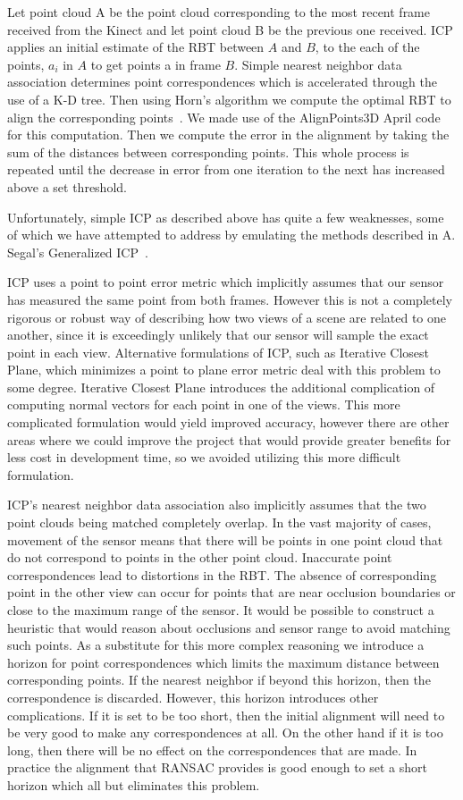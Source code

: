 \documentclass[letterpaper, 10pt, conference]{ieeeconf}
\begin{document}
	Let point cloud A be the point cloud corresponding to the most recent frame received from the Kinect and let point cloud B be the previous one received.  ICP applies an initial estimate of the RBT between $A$ and $B$, to the each of the points, $a_{i}$ in $A$ to get points a in frame $B$.  Simple nearest neighbor data association determines point correspondences which is accelerated through the use of a K-D tree.  Then using Horn's algorithm we compute the optimal RBT to align the corresponding points~\cite{horn1987closed}.  We made use of the AlignPoints3D April code for this computation.  Then we compute the error in the alignment by taking the sum of the distances between corresponding points.  This whole process is repeated until the decrease in error from one iteration to the next has increased above a set threshold.

	Unfortunately, simple ICP as described above has quite a few weaknesses, some of which we have attempted to address
by emulating the methods described in A. Segal's Generalized ICP~\cite{gicp}.

	ICP uses a point to point error metric which implicitly assumes that our sensor has measured the same point from both frames.  However this is not a completely rigorous or robust way of describing how two views of a scene are related to one another, since it is exceedingly unlikely that our sensor will sample the exact point in each view.  Alternative formulations of ICP, such as Iterative Closest Plane, which minimizes a point to plane error metric deal with this problem to some degree.  Iterative Closest Plane introduces the additional complication of computing normal vectors for each point in one of the views.  This more complicated formulation would yield improved accuracy, however there are other areas where we could improve the project that would provide greater benefits for less cost in development time, so we avoided utilizing this more difficult formulation.

	ICP's nearest neighbor data association also implicitly assumes that the two point clouds being matched completely overlap.  In the vast majority of cases, movement of the sensor means that there will be points in one point cloud that do not correspond to points in the other point cloud.  Inaccurate point correspondences lead to distortions in the RBT.  The absence of corresponding point in the other view can occur for points that are near occlusion boundaries or close to the maximum range of the sensor.  It would be possible to construct a heuristic that would reason about occlusions and sensor range to avoid matching such points.  As a substitute for this more complex reasoning we introduce a horizon for point correspondences which limits the maximum distance between corresponding points.   If the nearest neighbor if beyond this horizon, then the correspondence is discarded.  However, this horizon introduces other complications.  If it is set to be too short, then the initial alignment will need to be very good to make any correspondences at all.  On the other hand if it is too long, then there will be no effect on the correspondences that are made.  In practice the alignment that RANSAC provides is good enough  to set a short horizon which all but eliminates this problem.
\end{document}
